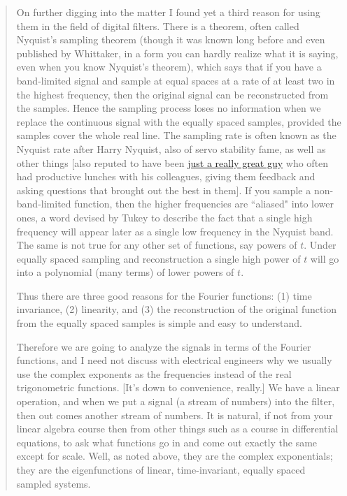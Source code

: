 \documentclass[10pt]{article}
\begin{document}
{\begin{quotation}
On further digging into the matter I found yet a third reason for using them in the field of digital filters. There is a theorem, often called Nyquist's sampling theorem (though it was known long before and even published by Whittaker, in a form you can hardly realize what it is saying, even when you know Nyquist's theorem), which says that if you have a band-limited signal and sample at equal spaces at a rate of at least two in the highest frequency, then the original signal can be reconstructed from the samples. Hence the sampling process loses no information when we replace the continuous signal with the equally spaced samples, provided the samples cover the whole real line. The sampling rate is often known as the Nyquist rate after Harry Nyquist, also of servo stability fame, as well as other things [also reputed to have been \href{https://deanebarker.net/tech/linkedin/harry-nyquist-again/}{just a really great guy} who often had productive lunches with his colleagues, giving them feedback and asking questions that brought out the best in them]. If you sample a non-band-limited function, then the higher frequencies are ``aliased" into lower ones, a word devised by Tukey to describe the fact that a single high frequency will appear later as a single low frequency in the Nyquist band. The same is not true for any other set of functions, say powers of $t$. Under equally spaced sampling and reconstruction a single high power of $t$ will go into a polynomial (many terms) of lower powers of $t$.

Thus there are three good reasons for the Fourier functions: (1) time invariance, (2) linearity, and (3) the reconstruction of the original function from the equally spaced samples is simple and easy to understand.

Therefore we are going to analyze the signals in terms of the Fourier functions, and I need not discuss with electrical engineers why we usually use the complex exponents as the frequencies instead of the real trigonometric functions. [It's down to convenience, really.] We have a linear operation, and when we put a signal (a stream of numbers) into the filter, then out comes another stream of numbers. It is natural, if not from your linear algebra course then from other things such as a course in differential equations, to ask what functions go in and come out exactly the same except for scale. Well, as noted above, they are the complex exponentials; they are the eigenfunctions of linear, time-invariant, equally spaced sampled systems.


\end{quotation}}
\end{document}
